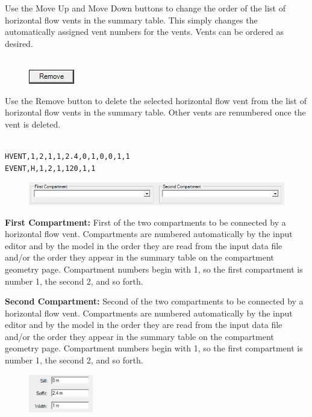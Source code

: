 Use the Move Up and Move Down buttons to change the order of the list of horizontal flow vents in the summary table. This simply changes the automatically assigned vent numbers for the vents. Vents can be ordered as desired. \\~ \\

\begin{figure}
  \includegraphics[width=0.781in]{FIGURES/Input_File/Remove_Button}
\end{figure}

Use the Remove button to delete the selected horizontal flow vent from the list of horizontal flow vents in the summary table.  Other vents are renumbered once the vent is deleted. \\~ \\

\begin{lstlisting}
HVENT,1,2,1,1,2.4,0,1,0,0,1,1
EVENT,H,1,2,1,120,1,1
\end{lstlisting}

\begin{figure}[h!]
\includegraphics[width=6.5in]{FIGURES/Input_File/Compartment_From_To}
\end{figure}

\textbf{First Compartment:} First of the two compartments to be connected by a horizontal flow vent.  Compartments are numbered automatically by the input editor and by the model in the order they are read from the input data file and/or the order they appear in the summary table on the compartment geometry page. Compartment numbers begin with 1, so the first compartment is number 1, the second 2, and so forth.

\textbf{Second Compartment:} Second of the two compartments to be connected by a horizontal flow vent.  Compartments are numbered automatically by the input editor and by the model in the order they are read from the input data file and/or the order they appear in the summary table on the compartment geometry page. Compartment numbers begin with 1, so the first compartment is number 1, the second 2, and so forth.

\begin{figure}[h!]
\begin{center}
\includegraphics[width=1.1in]{FIGURES/Input_File/Vent_Size}
\end{center}
\end{figure}

